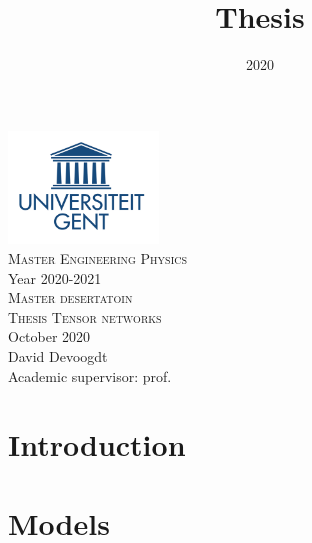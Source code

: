 \documentclass{article}
\title{Thesis}
\date{2020}
\begin{document}



\onecolumn
\begin{titlepage}
    \begin{center}

        \includegraphics[width=4cm]{Figuren/UGent.png} \\[0.5cm]    %

        \Large{\textsc{Master Engineering Physics}} \\[0.5cm]  %

        \normalsize{Year 2020-2021} \\[3cm]  %

        \huge{\textsc{Master desertatoin}} \\[0.25cm]   %

        \Large{\textsc{Thesis Tensor networks}}\\[0.25cm]

        \large \textnormal{October 2020} \\[2.5cm]   %


        David Devoogdt \\       [2.5cm]


        Academic supervisor: prof.




        \vfill

    \end{center}
\end{titlepage}

\tableofcontents

\newpage
\listoftodos
\newpage

{}



\section{Introduction}


\section{Models}

\end{document}
